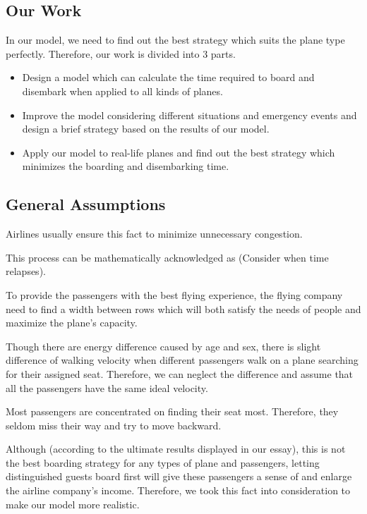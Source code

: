 \documentclass{article}
\begin{document}
	\subsection{Our Work}
	In our model, we need to find out the best strategy which suits the plane type perfectly. Therefore, our work is divided into 3 parts.
	\begin{itemize}
		\item Design a model which can calculate the time required to board and disembark when applied to all kinds of planes.
		\item Improve the model considering different situations and emergency events and design a brief strategy based on the results of our model.
		\item Apply our model to real-life planes and find out the best strategy which minimizes the boarding and disembarking time.
	\end{itemize}
	\subsection{General Assumptions}
	\begin{enumerate}

		Airlines usually ensure this fact to minimize unnecessary congestion.

		This process can be mathematically acknowledged as  (Consider when time relapses).

		To provide the passengers with the best flying experience, the flying company need to find a width between rows which will both satisfy the needs of people and maximize the plane's capacity.

		Though there are energy difference caused by age and sex, there is slight difference of walking velocity when different passengers walk on a plane searching for their assigned seat. Therefore, we can neglect the difference and assume that all the passengers have the same ideal velocity.

		Most passengers are concentrated on finding their seat most. Therefore, they seldom miss their way and try to move backward.

		Although (according to the ultimate results displayed in our essay), this is not the best boarding strategy for any types of plane and passengers, letting distinguished guests board first will give these passengers a sense of  and enlarge the airline company's income. Therefore, we took this fact into consideration to make our model more realistic.
	\end{enumerate}
\end{document}
